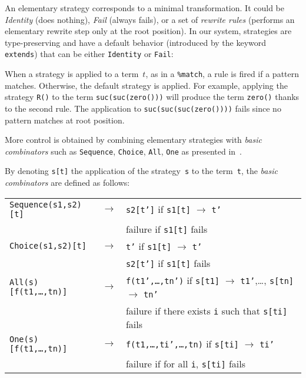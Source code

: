 \documentclass[runningheads]{llncs}
\begin{document}
An elementary strategy corresponds to a minimal transformation. It could be
\emph{Identity} (does nothing), \emph{Fail} (always fails), or a set of
\emph{rewrite rules} (performs an elementary rewrite step only at the root
position).  In our system, strategies are type-preserving and have a default
behavior (introduced by the keyword \texttt{extends}) that can be either
\texttt{Identity} or \texttt{Fail}:


When a strategy is applied to a term~$t$, as in a \texttt{\%match}, a rule is
fired if a pattern matches. Otherwise, the default strategy is applied.
For example, applying the strategy \texttt{R()} to the term
\texttt{suc(suc(zero()))} will produce the term \texttt{zero()} thanks to the
second rule. The application to \texttt{suc(suc(suc(zero())))} fails since no
pattern matches at root position.

More control is obtained by combining elementary strategies with \emph{basic
combinators} such as \texttt{Sequence}, \texttt{Choice},
\texttt{All}, \texttt{One} as presented
in~\cite{BKK98,visser-icfp98}.

By denoting \texttt{s[t]} the application of the strategy~\texttt{s} to the
term~\texttt{t}, the \emph{basic combinators} are defined as follows:

\begin{small}
\begin{tabular}{lll}

\texttt{Sequence(s1,s2)[t]} & $\rightarrow$ & \texttt{s2[t']} if \texttt{s1[t]}
$\rightarrow$ \texttt{t'}\\
&& failure if \texttt{s1[t]} fails\\

\texttt{Choice(s1,s2)[t]} & $\rightarrow$ & \texttt{t'} if \texttt{s1[t]}
$\rightarrow$ \texttt{t'}\\
&& \texttt{s2[t']} if \texttt{s1[t]} fails\\

\texttt{All(s)[f(t1,\ldots,tn)]} & $\rightarrow$ & \texttt{f(t1',\ldots,tn')}
if \texttt{s[t1]} $\rightarrow$ \texttt{t1'},\ldots, \texttt{s[tn]}
$\rightarrow$ \texttt{tn'}\\
&& failure if there exists \texttt{i} such that \texttt{s[ti]} fails\\

\texttt{One(s)[f(t1,\ldots,tn)]} & $\rightarrow$ &
\texttt{f(t1,\ldots,ti',\ldots,tn)} if \texttt{s[ti]}  $\rightarrow$
\texttt{ti'}\\
&& failure if for all \texttt{i}, \texttt{s[ti]} fails\\
\end{tabular}
\end{small}
\end{document}
